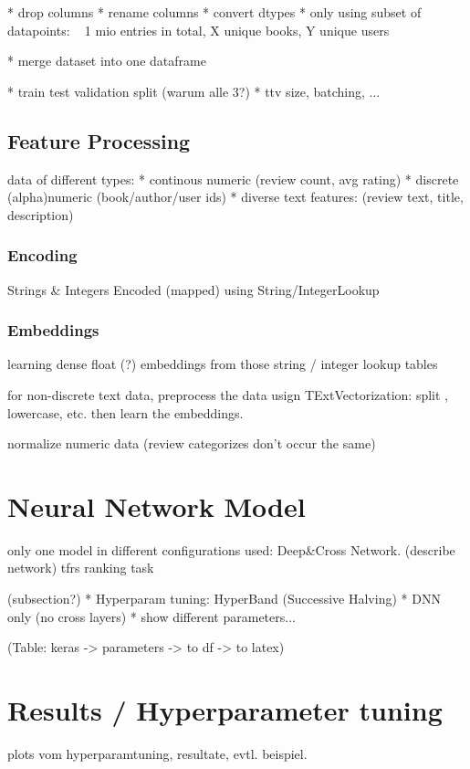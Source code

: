 \documentclass[10pt,final,journal,a4paper,oneside,twocolumn]{IEEEtran}
\begin{document}
* drop columns
* rename columns
* convert dtypes
* only using subset of datapoints: ~ 1 mio entries in total, X unique books, Y unique users

* merge dataset into one dataframe

* train test validation split (warum alle 3?)
* ttv size, batching, ...

\subsection{Feature Processing}
data of different types:
* continous numeric (review count, avg rating)
* discrete (alpha)numeric (book/author/user ids)
* diverse text features: (review text, title, description)

\subsubsection{Encoding}
Strings \& Integers Encoded (mapped) using String/IntegerLookup 
\subsubsection{Embeddings}
learning dense float (?) embeddings from those string / integer lookup tables

for non-discrete text data, preprocess the data usign TExtVectorization: split , lowercase, etc. then learn the embeddings.

normalize numeric data (review categorizes don't occur the same)

\section{Neural Network Model}
only one model in different configurations used: Deep\&Cross Network.
(describe network)
tfrs ranking task

(subsection?)
* Hyperparam tuning: HyperBand (Successive Halving)
* DNN only (no cross layers)
* show different parameters...

(Table: keras -> parameters -> to df -> to latex)


\section{Results / Hyperparameter tuning}
plots vom hyperparamtuning, resultate, evtl. beispiel.
\end{document}
